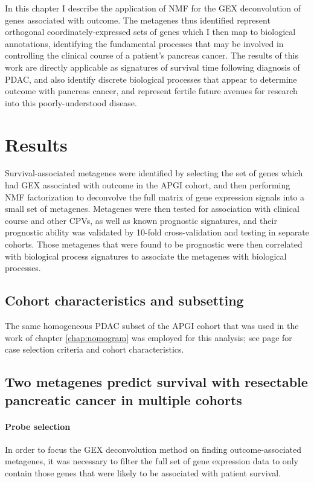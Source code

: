 \documentclass[dissertation.tex]{subfiles}
\begin{document}
In this chapter I describe the application of \gls{NMF} for the \gls{GEX} deconvolution of genes associated with outcome.  The metagenes thus identified represent orthogonal coordinately-expressed sets of genes which I then map to biological annotations, identifying the fundamental processes that may be involved in controlling the clinical course of a patient's pancreas cancer.  The results of this work are directly applicable as signatures of survival time following diagnosis of \gls{PDAC}, and also identify discrete biological processes that appear to determine outcome with pancreas cancer, and represent fertile future avenues for research into this poorly-understood disease.


\section{Results}

Survival-associated metagenes were identified by selecting the set of genes which had \gls{GEX} associated with outcome in the \gls{APGI} cohort, and then performing \gls{NMF} factorization to deconvolve the full matrix of gene expression signals into a small set of metagenes.  Metagenes were then tested for association with clinical course and other \glspl{CPV}, as well as known prognostic signatures, and their prognostic ability was validated by 10-fold cross-validation and testing in separate cohorts.  Those metagenes that were found to be prognostic were then correlated with biological process signatures to associate the metagenes with biological processes.

\subsection{Cohort characteristics and subsetting}
The same homogeneous \gls{PDAC} subset of the \gls{APGI} cohort that was used in the work of chapter \ref{chap:nomogram} was employed for this analysis; see page \pageref{chap:nomogram} for case selection criteria and cohort characteristics.  

\subsection{Two metagenes predict survival with resectable pancreatic cancer in multiple cohorts}
\paragraph{Probe selection}
In order to focus the \gls{GEX} deconvolution method on finding outcome-associated metagenes, it was necessary to filter the full set of gene expression data to only contain those genes that were likely to be associated with patient survival.  %
\end{document}
